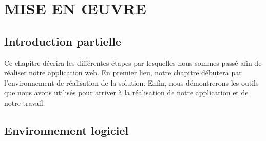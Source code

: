 \chapter[MISE EN ŒUVRE]{MISE EN ŒUVRE}
    \section[Introduction partielle]{Introduction partielle}
    Ce chapitre décrira les différentes étapes par lesquelles nous
    sommes passé afin de réaliser notre application web. En premier
    lieu, notre chapitre débutera par l’environnement de réalisation
    de la solution.
    Enfin, nous démontrerons les outils que nous avons utilisés pour arriver à la réalisation de notre application et de
    notre travail.
    \section[Environnement logiciel]{Environnement logiciel}

